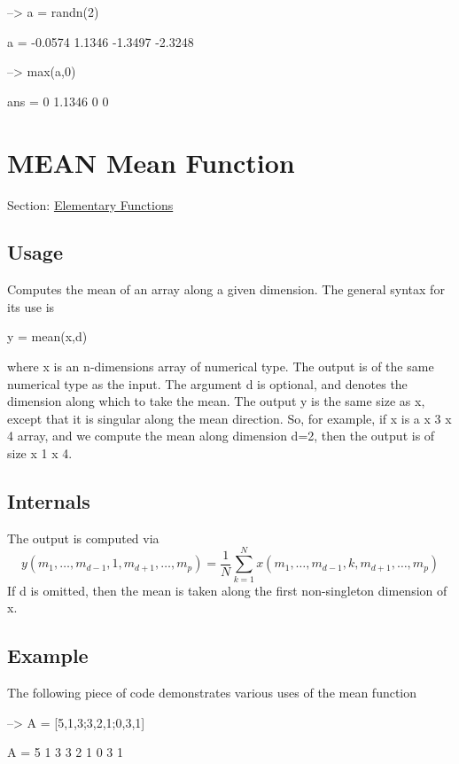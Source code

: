 \begin{DoxyVerbInclude}
--> a = randn(2)

a = 
   -0.0574    1.1346 
   -1.3497   -2.3248 

--> max(a,0)

ans = 
         0    1.1346 
         0         0 
\end{DoxyVerbInclude}
 \hypertarget{elementary_mean}{}\section{M\-E\-A\-N Mean Function}\label{elementary_mean}
Section\-: \hyperlink{sec_elementary}{Elementary Functions} \hypertarget{vtkwidgets_vtkxyplotwidget_Usage}{}\subsection{Usage}\label{vtkwidgets_vtkxyplotwidget_Usage}
Computes the mean of an array along a given dimension. The general syntax for its use is \begin{DoxyVerb}  y = mean(x,d)
\end{DoxyVerb}
 where {\ttfamily x} is an {\ttfamily n}-\/dimensions array of numerical type. The output is of the same numerical type as the input. The argument {\ttfamily d} is optional, and denotes the dimension along which to take the mean. The output {\ttfamily y} is the same size as {\ttfamily x}, except that it is singular along the mean direction. So, for example, if {\ttfamily x} is a { x 3 x 4} array, and we compute the mean along dimension {\ttfamily d=2}, then the output is of size { x 1 x 4}. \hypertarget{transforms_svd_Function}{}\subsection{Internals}\label{transforms_svd_Function}
The output is computed via \[ y(m_1,\ldots,m_{d-1},1,m_{d+1},\ldots,m_{p}) = \frac{1}{N} \sum_{k=1}^{N} x(m_1,\ldots,m_{d-1},k,m_{d+1},\ldots,m_{p}) \] If {\ttfamily d} is omitted, then the mean is taken along the first non-\/singleton dimension of {\ttfamily x}. \hypertarget{variables_struct_Example}{}\subsection{Example}\label{variables_struct_Example}
The following piece of code demonstrates various uses of the mean function


\begin{DoxyVerbInclude}
--> A = [5,1,3;3,2,1;0,3,1]

A = 
 5 1 3 
 3 2 1 
 0 3 1 
\end{DoxyVerbInclude}


